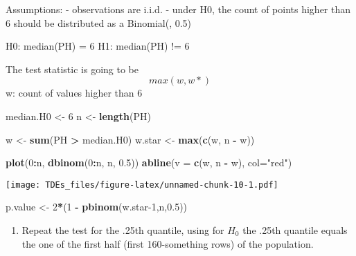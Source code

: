 \documentclass[
]{article}
\newenvironment{Shaded}{\begin{snugshade}}{\end{snugshade}}
\newcommand{\AttributeTok}[1]{\textcolor[rgb]{0.13,0.29,0.53}{#1}}
\newcommand{\DecValTok}[1]{\textcolor[rgb]{0.00,0.00,0.81}{#1}}
\newcommand{\FloatTok}[1]{\textcolor[rgb]{0.00,0.00,0.81}{#1}}
\newcommand{\FunctionTok}[1]{\textcolor[rgb]{0.13,0.29,0.53}{\textbf{#1}}}
\newcommand{\NormalTok}[1]{#1}
\newcommand{\OtherTok}[1]{\textcolor[rgb]{0.56,0.35,0.01}{#1}}
\newcommand{\SpecialCharTok}[1]{\textcolor[rgb]{0.81,0.36,0.00}{\textbf{#1}}}
\newcommand{\StringTok}[1]{\textcolor[rgb]{0.31,0.60,0.02}{#1}}
\providecommand{\tightlist}{%
  \setlength{\itemsep}{0pt}\setlength{\parskip}{0pt}}
\begin{document}
Assumptions: - observations are i.i.d. - under H0, the count of points
higher than 6 should be distributed as a Binomial(, 0.5)

H0: median(PH) = 6 H1: median(PH) != 6

The test statistic is going to be \[
max(w,w*)
\] w: count of values higher than 6

\begin{Shaded}
\begin{Highlighting}[]
\NormalTok{median.H0 }\OtherTok{\textless{}{-}} \DecValTok{6}
\NormalTok{n }\OtherTok{\textless{}{-}} \FunctionTok{length}\NormalTok{(PH)}

\NormalTok{w }\OtherTok{\textless{}{-}} \FunctionTok{sum}\NormalTok{(PH }\SpecialCharTok{\textgreater{}}\NormalTok{ median.H0)}
\NormalTok{w.star }\OtherTok{\textless{}{-}} \FunctionTok{max}\NormalTok{(}\FunctionTok{c}\NormalTok{(w, n }\SpecialCharTok{{-}}\NormalTok{ w))}

\FunctionTok{plot}\NormalTok{(}\DecValTok{0}\SpecialCharTok{:}\NormalTok{n, }\FunctionTok{dbinom}\NormalTok{(}\DecValTok{0}\SpecialCharTok{:}\NormalTok{n, n, }\FloatTok{0.5}\NormalTok{))}
\FunctionTok{abline}\NormalTok{(}\AttributeTok{v =} \FunctionTok{c}\NormalTok{(w, n }\SpecialCharTok{{-}}\NormalTok{ w), }\AttributeTok{col=}\StringTok{"red"}\NormalTok{)}
\end{Highlighting}
\end{Shaded}

\texttt{[image: TDEs\_files/figure-latex/unnamed-chunk-10-1.pdf]}

\begin{Shaded}
\begin{Highlighting}[]
\NormalTok{p.value }\OtherTok{\textless{}{-}} \DecValTok{2}\SpecialCharTok{*}\NormalTok{(}\DecValTok{1} \SpecialCharTok{{-}} \FunctionTok{pbinom}\NormalTok{(w.star}\DecValTok{{-}1}\NormalTok{,n,}\FloatTok{0.5}\NormalTok{)) }
\end{Highlighting}
\end{Shaded}

\begin{enumerate}
\def\labelenumi{\arabic{enumi}.}
\setcounter{enumi}{2}
\tightlist
\item
  Repeat the test for the .25th quantile, using for \(H_0\) the .25th
  quantile equals the one of the first half (first 160-something rows)
  of the population.
\end{enumerate}

\begin{Shaded}
\end{Shaded}
\end{document}
